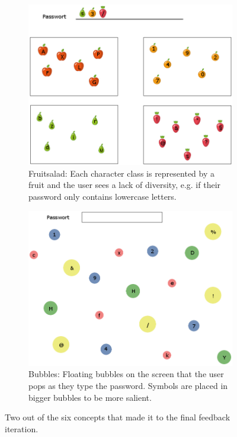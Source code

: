 \begin{figure}
	\centering
	\begin{subfigure}[!t]{0.49\textwidth}
		\includegraphics[width=\textwidth]{figures/co-design/fruitsalad-1}
		\caption{\label{fig:co-design:fruitsalad} Fruitsalad: Each character class is represented by a fruit and the user sees a lack of diversity, e.g. if their password only contains lowercase letters.}
	\end{subfigure}
	\begin{subfigure}[!t]{0.49\textwidth}
		\includegraphics[width=\textwidth]{figures/co-design/bubbles-1}
		\caption{\label{fig:co-design:bubbles-concept}Bubbles: Floating bubbles on the screen that the user pops as they type the password. Symbols are placed in bigger bubbles to be more salient.}
	\end{subfigure}
	\caption{\label{fig:co-design:concepts}Two out of the six concepts that made it to the final feedback iteration.} 
\end{figure}


